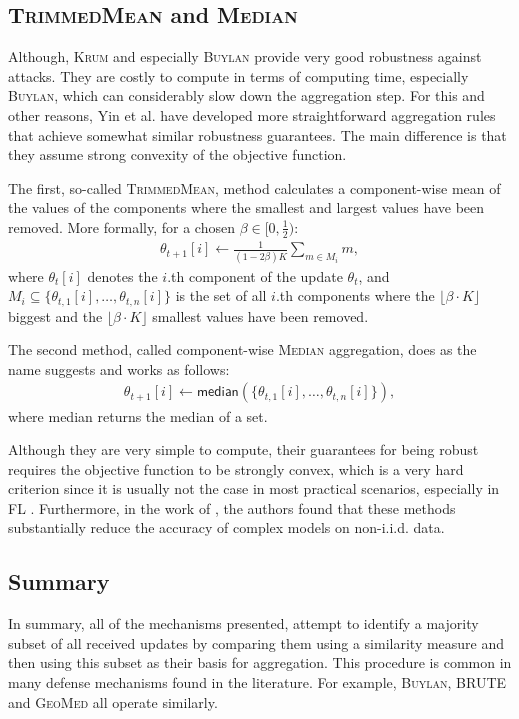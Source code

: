 \documentclass[conference]{IEEEtran}
\begin{document}
\subsection{\textsc{TrimmedMean} and \textsc{Median}}
Although, \textsc{Krum} and especially \textsc{Buylan} provide very good robustness against attacks. They are costly to compute in terms of computing time, especially \textsc{Buylan}, which can considerably slow down the aggregation step. For this and other reasons, Yin et al. \cite{Yin2018} have developed more straightforward aggregation rules that achieve somewhat similar robustness guarantees. The main difference is that they assume strong convexity of the objective function.

The first, so-called \textsc{TrimmedMean}, method calculates a component-wise mean of the values of the components where the smallest and largest values have been removed. More formally, for a chosen $\beta \in [0, \frac{1}{2})$:
\begin{align} 
    \theta_{t+1}[i] \leftarrow \frac{1}{(1-2\beta)K} \sum_{m \in M_i} m,
\end{align}
where $\theta_{t}[i]$ denotes the $i$.th component of the update $\theta_{t}$, and $M_i \subseteq \{\theta_{t,1}[i], \ldots , \theta_{t,n}[i]\}$ is the set of all $i$.th components where the $\lfloor \beta \cdot K \rfloor$ biggest and the $\lfloor \beta \cdot K \rfloor$ smallest values have been removed.

The second method, called component-wise \textsc{Median} aggregation, does as the name suggests and works as follows:
\begin{align}
    \theta_{t+1}[i] \leftarrow \textsf{median}(\{\theta_{t,1}[i], \ldots , \theta_{t,n}[i]\}),
\end{align}
where \textsf{median} returns the median of a set.

Although they are very simple to compute, their guarantees for being robust requires the objective function to be strongly convex, which is a very hard criterion since it is usually not the case in most practical scenarios, especially in FL \cite{Bagdasaryan2018}. Furthermore, in the work of \cite{Chen2019}, the authors found that these methods substantially reduce the accuracy of complex models on non-i.i.d. data.

\subsection*{Summary}
In summary, all of the mechanisms presented, attempt to identify a majority subset of all received updates by comparing them using a similarity measure and then using this subset as their basis for aggregation. This procedure is common in many defense mechanisms found in the literature. For example, \textsc{Buylan}\cite{Blanchard2017}, \textsc{BRUTE}\cite{Mhamdi2018} and \textsc{GeoMed}\cite{Chen2017, Blanchard2017} all operate similarly.
\end{document}
